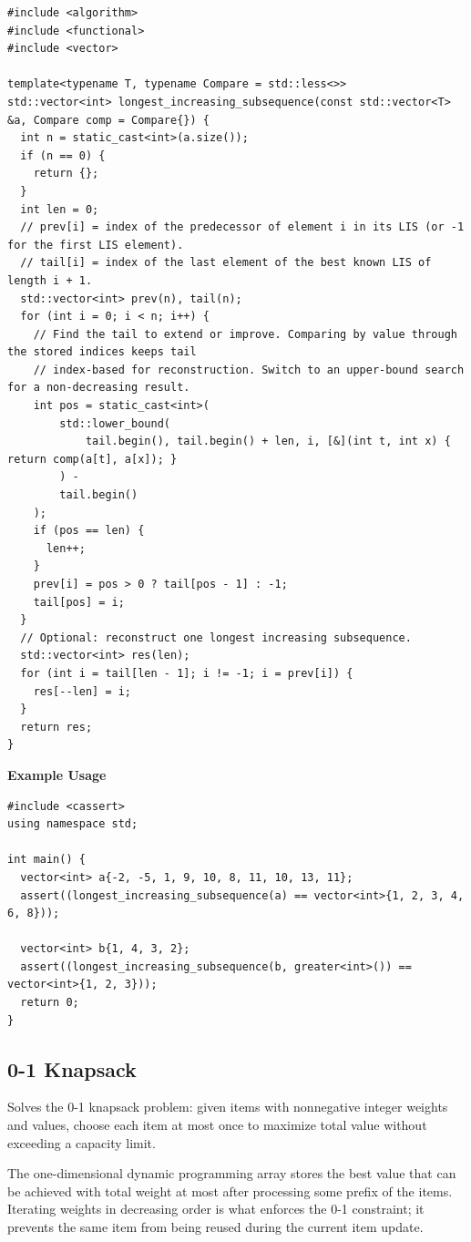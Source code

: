 \begin{lstlisting}[style=cpp]
#include <algorithm>
#include <functional>
#include <vector>

template<typename T, typename Compare = std::less<>>
std::vector<int> longest_increasing_subsequence(const std::vector<T> &a, Compare comp = Compare{}) {
  int n = static_cast<int>(a.size());
  if (n == 0) {
    return {};
  }
  int len = 0;
  // prev[i] = index of the predecessor of element i in its LIS (or -1 for the first LIS element).
  // tail[i] = index of the last element of the best known LIS of length i + 1.
  std::vector<int> prev(n), tail(n);
  for (int i = 0; i < n; i++) {
    // Find the tail to extend or improve. Comparing by value through the stored indices keeps tail
    // index-based for reconstruction. Switch to an upper-bound search for a non-decreasing result.
    int pos = static_cast<int>(
        std::lower_bound(
            tail.begin(), tail.begin() + len, i, [&](int t, int x) { return comp(a[t], a[x]); }
        ) -
        tail.begin()
    );
    if (pos == len) {
      len++;
    }
    prev[i] = pos > 0 ? tail[pos - 1] : -1;
    tail[pos] = i;
  }
  // Optional: reconstruct one longest increasing subsequence.
  std::vector<int> res(len);
  for (int i = tail[len - 1]; i != -1; i = prev[i]) {
    res[--len] = i;
  }
  return res;
}
\end{lstlisting}
\textbf{Example Usage}\par
\begin{lstlisting}[style=cpp]
#include <cassert>
using namespace std;

int main() {
  vector<int> a{-2, -5, 1, 9, 10, 8, 11, 10, 13, 11};
  assert((longest_increasing_subsequence(a) == vector<int>{1, 2, 3, 4, 6, 8}));

  vector<int> b{1, 4, 3, 2};
  assert((longest_increasing_subsequence(b, greater<int>()) == vector<int>{1, 2, 3}));
  return 0;
}
\end{lstlisting}
\subsection{0-1 Knapsack}
\label{sec:1.3.3}
Solves the 0-1 knapsack problem: given items with nonnegative integer weights and values, choose each item at most once to maximize total value without exceeding a capacity limit.

The one-dimensional dynamic programming array  stores the best value that can be achieved with total weight at most  after processing some prefix of the items. Iterating weights in decreasing order is what enforces the 0-1 constraint; it prevents the same item from being reused during the current item update.

